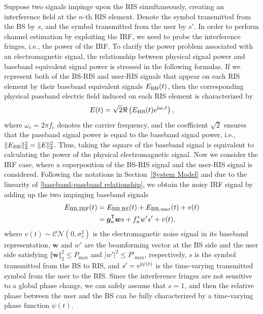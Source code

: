 \documentclass[journal,twocolumn]{IEEEtran}
\theoremstyle{nonumberplain}
\def \T {\bm \Theta}
\def \T {^{\mathsf{T}}}
\begin{document}
    \fi


    Suppose two signals impinge upon the RIS simultaneously, creating an interference field at the $n$-th RIS element. Denote the symbol transmitted from the \ac{BS} by $s$, and the symbol transmitted from the user by $s'$. In order to perform channel estimation by exploiting the \ac{IRF}, we need to probe the interference fringes, i.e., the power of the \ac{IRF}. To clarify the power problem associated with an electromagnetic signal, the relationship between physical signal power and baseband equivalent signal power is stressed in the following formulas. 
    If we represent both of the BS-RIS and user-RIS signals that appear on each RIS element by their baseband equivalent signals $E_{{\rm BB}}(t)$, 
    then the corresponding physical passband electric field induced on each RIS element is characterized by 
    \begin{equation}
        E(t) = \sqrt{2} \Re\left( E_{{\rm BB}}(t)e^{{\rm j}\omega_c t} \right),
        \label{baseband-passband relationship}
    \end{equation}
    where $\omega_c = 2\pi f_c$ denotes the carrier frequency, and the coefficient $\sqrt{2}$ ensures that the passband signal power is equal to the baseband signal power, i.e., 
    $\lVert E_{{\rm BB}}\rVert_2^2 = \lVert E\rVert_2^2$. 
    Thus, taking the square of the baseband signal is equivalent to calculating the power of the physical electromagnetic signal. 
    Now we consider the IRF case, where a superposition of the BS-RIS signal and the user-RIS signal is considered. 
    Following the notations in Section~\ref{System Model} and due to the linearity of \eqref{baseband-passband relationship}, we obtain the noisy IRF signal by adding up the two impinging baseband signals
    \begin{equation}
        \begin{aligned}
            E_{{\rm BB, IRF}}(t) &= E_{{\rm BB, BS}}(t)+E_{{\rm BB,user}}(t)+v(t)\\
            &=\bm g_{n}\T\bm w s+f_{n}^{*} w' s' +v(t),
        \end{aligned}
    \end{equation}
    where $v(t)\sim \mathcal{CN}(0,\sigma_{v}^{2})$ is the electromagnetic noise signal in its baseband representation,
    $\bm w$ and $w'$ are the beamforming vector at the BS side and the user side satisfying $\Vert \bm w \Vert_{2}^{2}\leq P_{\text{max}}$ and $|w'|^{2}\leq P'_{\text{max}}$, respectively,
    $s$ is the symbol transmitted from the BS to RIS, and $s'=e^{{\rm j} \psi(t)}$ is the time-varying transmitted symbol from the user to the RIS.  
    Since the interference fringes are not sensitive to a global phase change, we can safely assume that $s=1$, and then the relative phase between the user and the BS can be fully characterized by a time-varying phase function $\psi(t)$.  
\end{document}
